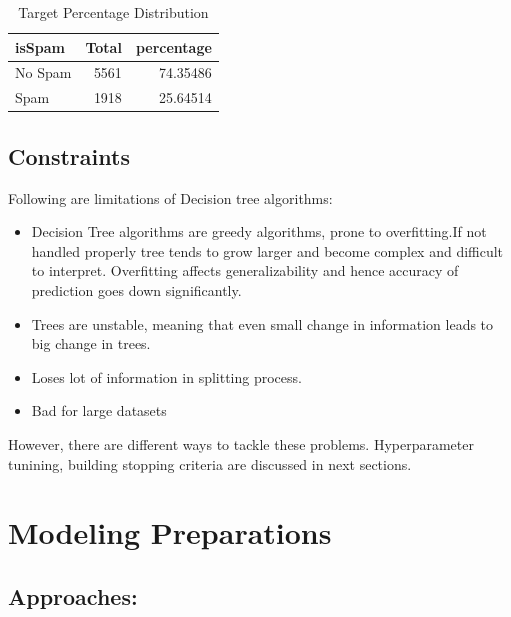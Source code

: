 \documentclass[
]{article}
\providecommand{\tightlist}{%
  \setlength{\itemsep}{0pt}\setlength{\parskip}{0pt}}
\begin{document}
\begin{table}[!h]

\caption{\label{tab:unnamed-chunk-18}Target Percentage Distribution}
\centering
\begin{tabular}[t]{lrr}
\toprule
isSpam & Total & percentage\\
\midrule
No Spam & 5561 & 74.35486\\
Spam & 1918 & 25.64514\\
\bottomrule
\end{tabular}
\end{table}

\hypertarget{constraints}{%
\subsection{Constraints}\label{constraints}}

Following are limitations of Decision tree algorithms:

\begin{itemize}
\tightlist
\item
  Decision Tree algorithms are greedy algorithms, prone to
  overfitting.If not handled properly tree tends to grow larger and
  become complex and difficult to interpret. Overfitting affects
  generalizability and hence accuracy of prediction goes down
  significantly.
\item
  Trees are unstable, meaning that even small change in information
  leads to big change in trees.
\item
  Loses lot of information in splitting process.
\item
  Bad for large datasets
\end{itemize}

However, there are different ways to tackle these problems.
Hyperparameter tunining, building stopping criteria are discussed in
next sections.

\newpage

\hypertarget{modeling-preparations}{%
\section{Modeling Preparations}\label{modeling-preparations}}

\hypertarget{approaches}{%
\subsection{Approaches:}\label{approaches}}
\end{document}

